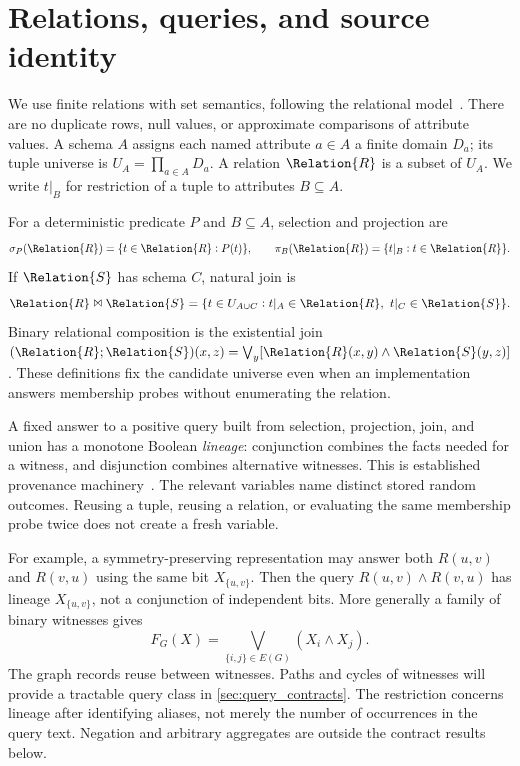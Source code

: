 \documentclass[../main.tex]{subfiles}
\begin{document}
\section{Relations, queries, and source identity}
\label{sec:relations}
We use finite relations with set semantics, following the relational
model~\cite{codd1970}. There are no duplicate rows, null values, or approximate
comparisons of attribute values. A schema $A$ assigns each named attribute
$a\in A$ a finite domain $D_a$; its tuple universe is
$U_A=\prod_{a\in A}D_a$. A relation $\Relation{R}$ is a subset of $U_A$.
We write $t|_B$ for restriction of a tuple to attributes $B\subseteq A$.

For a deterministic predicate $P$ and $B\subseteq A$, selection and projection are
\[
 \sigma_P(\Relation{R})=\{t\in\Relation{R}:P(t)\},\qquad
 \pi_B(\Relation{R})=\{t|_B:t\in\Relation{R}\}.
\]
If $\Relation{S}$ has schema $C$, natural join is
\[
 \Relation{R}\Join\Relation{S}
 =\{t\in U_{A\cup C}:t|_A\in\Relation{R},\ t|_C\in\Relation{S}\}.
\]
Binary relational composition is the existential join
$(\Relation{R};\Relation{S})(x,z)=\bigvee_y
 [\Relation{R}(x,y)\land\Relation{S}(y,z)]$.
These definitions fix the candidate universe even when an implementation
answers membership probes without enumerating the relation.

A fixed answer to a positive query built from selection, projection, join,
and union has a monotone Boolean \emph{lineage}: conjunction combines the
facts needed for a witness, and disjunction combines alternative witnesses.
This is established provenance machinery~\cite{green2007provenance,suciu2011}.
The relevant variables name distinct stored random outcomes. Reusing a tuple,
reusing a relation, or evaluating the same membership probe twice does not
create a fresh variable.

For example, a symmetry-preserving representation may answer both
$R(u,v)$ and $R(v,u)$ using the same bit $X_{\{u,v\}}$. Then the query
$R(u,v)\land R(v,u)$ has lineage $X_{\{u,v\}}$, not a conjunction of
independent bits. More generally a family of binary witnesses gives
\[
 F_G(X)=\bigvee_{\{i,j\}\in E(G)}(X_i\land X_j).
\]
The graph records reuse between witnesses. Paths and cycles of witnesses
will provide a tractable query class in \cref{sec:query_contracts}.
The restriction concerns lineage after identifying aliases, not merely the
number of occurrences in the query text. Negation and arbitrary aggregates
are outside the contract results below.
\end{document}
